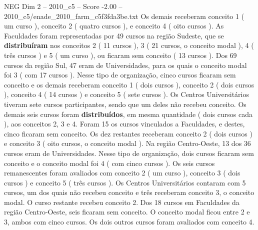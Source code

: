 \begin{textsample}{NEG Dim 2 – 2010\_c5 – Score -2.00 – 2010\_c5/enade\_2010\_farm\_c5f3fda3be.txt}
Os demais receberam conceito 1 ( um curso ), conceito 2 ( quatro cursos ), e conceito 4 ( oito cursos ).
As Faculdades foram representadas por 49 cursos na região Sudeste, que se \textbf{distribuíram} nos conceitos 2 ( 11 cursos ), 3 ( 21 cursos, o conceito modal ), 4 ( três cursos ) e 5 ( um curso ), ou ficaram sem conceito ( 13 cursos ).
Dos 69 cursos da região Sul, 47 eram de Universidades, para os quais o conceito modal foi 3 ( com 17 cursos ).
Nesse tipo de organização, cinco cursos ficaram sem conceito e os demais receberam conceito 1 ( dois cursos ), conceito 2 ( dois cursos ), conceito 4 ( 14 cursos ) e conceito 5 ( sete cursos ).
Os Centros Universitários tiveram sete cursos participantes, sendo que um deles não recebeu conceito.
Os demais seis cursos foram \textbf{distribuídos}, em mesma quantidade ( dois cursos cada ), aos conceitos 2, 3 e 4.
Foram 15 os cursos vinculados a Faculdades, e destes, cinco ficaram sem conceito.
Os dez restantes receberam conceito 2 ( dois cursos ) e conceito 3 ( oito cursos, o conceito modal ).
Na região Centro-Oeste, 13 dos 36 cursos eram de Universidades.
Nesse tipo de organização, dois cursos ficaram sem conceito e o conceito modal foi 4 ( com cinco cursos ).
Os seis cursos remanescentes foram avaliados com conceito 2 ( um curso ), conceito 3 ( dois cursos ) e conceito 5 ( três cursos ).
Os Centros Universitários contaram com 5 cursos, um dos quais não recebeu conceito e três receberam conceito 3, o conceito modal.
O curso restante recebeu conceito 2.
Dos 18 cursos em Faculdades da região Centro-Oeste, seis ficaram sem conceito.
O conceito modal ficou entre 2 e 3, ambos com cinco cursos.
Os dois outros cursos foram avaliados com conceito 4.

\end{textsample}

